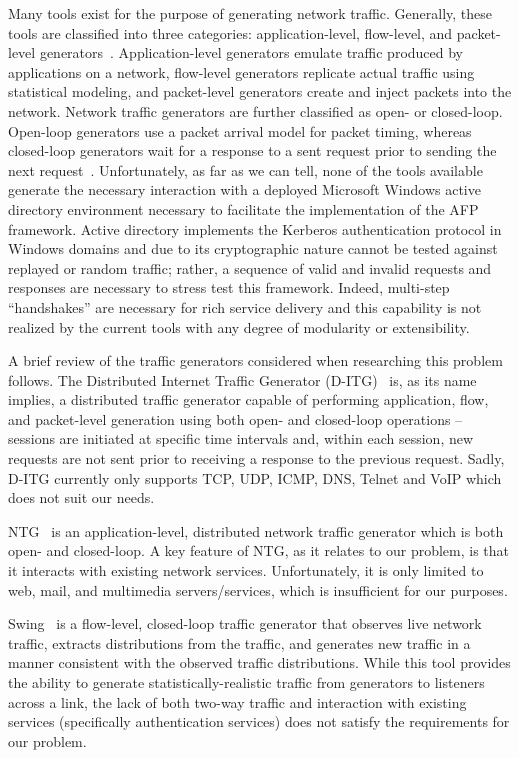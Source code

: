 Many tools exist for the purpose of generating network traffic.
Generally, these tools are classified into three categories: application-level,
flow-level, and packet-level generators~\cite{botta2012,zach2013}.
Application-level generators emulate traffic produced by applications on a
network, flow-level generators replicate actual traffic using statistical
modeling, and packet-level generators create and inject packets into the
network.  Network traffic generators are further classified as open- or
closed-loop.  Open-loop generators use a packet arrival model for packet
timing, whereas closed-loop generators wait for a response to a sent request
prior to sending the next request~\cite{weigle2006}.  Unfortunately, as far as
we can tell, none of the tools available generate the necessary interaction
with a deployed Microsoft Windows active directory environment necessary to
facilitate the implementation of the AFP framework.  Active directory
implements the Kerberos authentication protocol in Windows domains and due to
its cryptographic nature cannot be tested against replayed or random traffic;
rather, a sequence of valid and invalid requests and responses are necessary to
stress test this framework.  Indeed, multi-step ``handshakes'' are necessary
for rich service delivery and this capability is not realized by the current
tools with any degree of modularity or extensibility.

A brief review of the traffic generators considered when researching this
problem follows.  The Distributed Internet Traffic Generator
(D-ITG)~\cite{botta2012} is, as its name implies, a distributed traffic
generator capable of performing application, flow, and packet-level generation
using both open- and closed-loop operations -- sessions are initiated at
specific time intervals and, within each session, new requests are not sent
prior to receiving a response to the previous request.  Sadly, D-ITG currently
only supports TCP, UDP, ICMP, DNS, Telnet and VoIP which does not suit our
needs.

NTG~\cite{zach2013} is an application-level, distributed network traffic
generator which is both open- and closed-loop.  A key feature of NTG, as it
relates to our problem, is that it interacts with existing network services.
Unfortunately, it is only limited to web, mail, and multimedia
servers/services, which is insufficient for our purposes.

Swing~\cite{vishwanath2009} is a flow-level, closed-loop traffic generator that
observes live network traffic, extracts distributions from the traffic, and
generates new traffic in a manner consistent with the observed traffic
distributions.  While this tool provides the ability to generate
statistically-realistic traffic from generators to listeners across a link, the
lack of both two-way traffic and interaction with existing services
(specifically authentication services) does not satisfy the requirements for
our problem.

